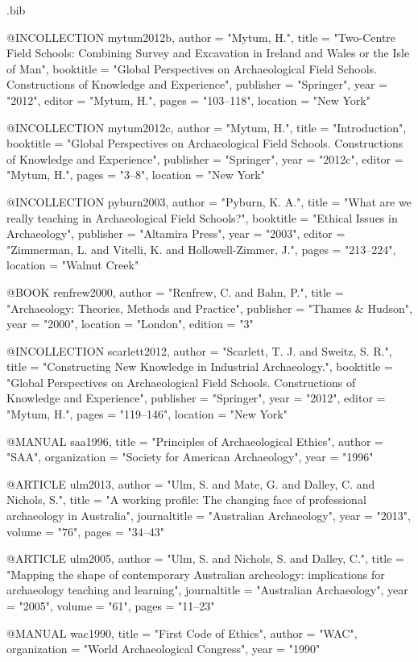 \begin{filecontents}{\IJSRAidentifier.bib}
	
	@INCOLLECTION {mytum2012b,
		author    = "Mytum, H.",
		title     = "Two-Centre Field Schools: Combining Survey and Excavation in Ireland and Wales or the Isle of Man",
		booktitle = "Global Perspectives on Archaeological Field Schools. Constructions of Knowledge and Experience",
		publisher = "Springer",
		year      = "2012",
		editor    = "Mytum, H.",
		pages     = "103--118",
		location   = "New York"
	}
	
	
	@INCOLLECTION {mytum2012c,
		author    = "Mytum, H.",
		title     = "Introduction",
		booktitle = "Global Perspectives on Archaeological Field Schools. Constructions of Knowledge and Experience",
		publisher = "Springer",
		year      = "2012c",
		editor    = "Mytum, H.",
		pages     = "3--8",
		location   = "New York"
	}
	
	
	@INCOLLECTION {pyburn2003,
		author    = "Pyburn, K. A.",
		title     = "What are we really teaching in Archaeological Field Schools?",
		booktitle = "Ethical Issues in Archaeology",
		publisher = "Altamira Press",
		year      = "2003",
		editor    = "Zimmerman, L. and Vitelli, K. and Hollowell-Zimmer, J.",
		pages     = "213--224",
		location   = "Walnut Creek"
	}
	
	
	@BOOK {renfrew2000,
		author    = "Renfrew, C. and Bahn, P.",
		title     = "Archaeology: Theories, Methods and Practice",
		publisher = "Thames \& Hudson",
		year      = "2000",
		location   = "London",
		edition   = "3"
	}
	
	@INCOLLECTION {scarlett2012,
		author    = "Scarlett, T. J. and Sweitz, S. R.",
		title     = "Constructing New Knowledge in Industrial Archaeology.",
		booktitle = "Global Perspectives on Archaeological Field Schools. Constructions of Knowledge and Experience",
		publisher = "Springer",
		year      = "2012",
		editor    = "Mytum, H.",
		pages     = "119--146",
		location   = "New York"
	}
	
	
	@MANUAL {saa1996,
		title        = "Principles of Archaeological Ethics",
		author       = "SAA",
		organization = "Society for American Archaeology",
		year         = "1996"
	}
	
	
	@ARTICLE {ulm2013,
		author  = "Ulm, S. and Mate, G. and Dalley, C. and Nichols, S.",
		title   = "A working profile: The changing face of professional archaeology in Australia",
		journaltitle = "Australian Archaeology",
		year    = "2013",
		volume  = "76",
		pages   = "34--43"
	}
	
	
	@ARTICLE {ulm2005,
		author  = "Ulm, S. and Nichols, S. and Dalley, C.",
		title   = "Mapping the shape of contemporary Australian archeology: implications for archaeology teaching and learning",
		journaltitle = "Australian Archaeology",
		year    = "2005",
		volume  = "61",
		pages   = "11--23"
	}
	
	
	@MANUAL {wac1990,
		title        = "First Code of Ethics",
		author       = "WAC",
		organization = "World Archaeological Congress",
		year         = "1990"
	}
\end{filecontents}
